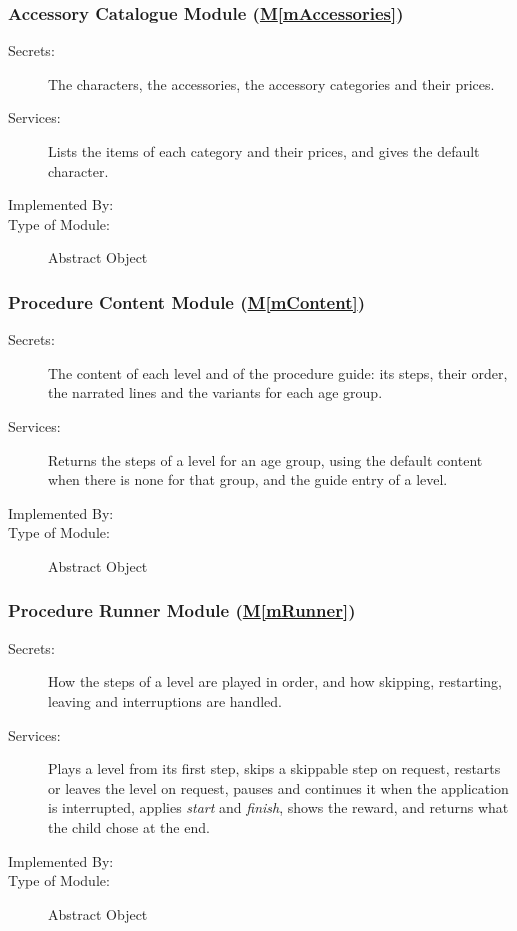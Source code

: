 \documentclass[12pt, titlepage]{article}
\newcommand{\mref}[1]{\hyperref[#1]{M\ref*{#1}}}
\begin{document}
\subsubsection{Accessory Catalogue Module (\mref{mAccessories})}

\begin{description}
\item[Secrets:] The characters, the accessories, the accessory categories and
  their prices.
\item[Services:] Lists the items of each category and their prices, and gives
  the default character.
\item[Implemented By:] \progname{}
\item[Type of Module:] Abstract Object
\end{description}

\subsubsection{Procedure Content Module (\mref{mContent})}

\begin{description}
\item[Secrets:] The content of each level and of the procedure guide: its
  steps, their order, the narrated lines and the variants for each age group.
\item[Services:] Returns the steps of a level for an age group, using the
  default content when there is none for that group, and the guide entry of a
  level.
\item[Implemented By:] \progname{}
\item[Type of Module:] Abstract Object
\end{description}

\subsubsection{Procedure Runner Module (\mref{mRunner})}

\begin{description}
\item[Secrets:] How the steps of a level are played in order, and how
  skipping, restarting, leaving and interruptions are handled.
\item[Services:] Plays a level from its first step, skips a skippable step on
  request, restarts or leaves the level on request, pauses and continues it
  when the application is interrupted, applies \emph{start} and \emph{finish},
  shows the reward, and returns what the child chose at the end.
\item[Implemented By:] \progname{}
\item[Type of Module:] Abstract Object
\end{description}
\end{document}
